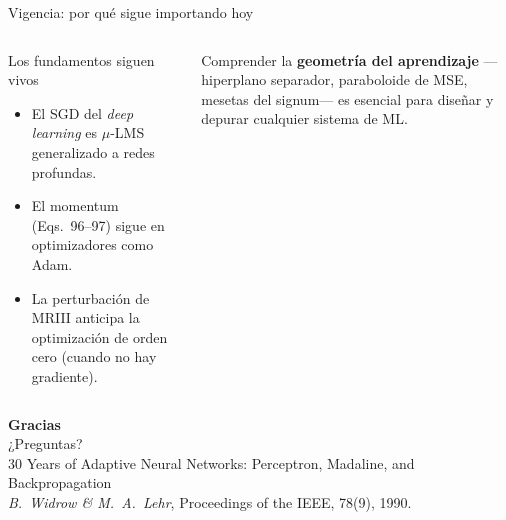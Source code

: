 \documentclass[aspectratio=169, 11pt, xcolor={dvipsnames,table}]{beamer}
\newcommand{\azul}[1]{\textcolor{UsachAzul}{#1}}
\begin{document}
\begin{frame}{Vigencia: por qué sigue importando hoy}
\begin{columns}[T]
\begin{block}{Los fundamentos siguen vivos}
\begin{itemize}
  \item El \azul{SGD} del \emph{deep learning} es $\mu$-LMS generalizado a redes profundas.
  \item El \azul{momentum} (Eqs.~96--97) sigue en optimizadores como Adam.
  \item La perturbación de MRIII anticipa la \azul{optimización de orden cero} (cuando no hay gradiente).
\end{itemize}
\end{block}
\begin{ideaclave}
Comprender la \textbf{geometría del aprendizaje} —hiperplano separador, paraboloide de MSE, mesetas
del signum— es esencial para diseñar y depurar cualquier sistema de ML.
\end{ideaclave}
\end{columns}
\end{frame}

\begin{frame}[plain]
\vfill
\begin{center}
{\Huge\bfseries\azul{Gracias}}\\[10pt]
{\large ¿Preguntas?}\\[18pt]
\footnotesize
30 Years of Adaptive Neural Networks: Perceptron, Madaline, and Backpropagation\\
\emph{B.\ Widrow \& M.\ A.\ Lehr}, Proceedings of the IEEE, 78(9), 1990.
\end{center}
\vfill
\end{frame}
\end{document}
